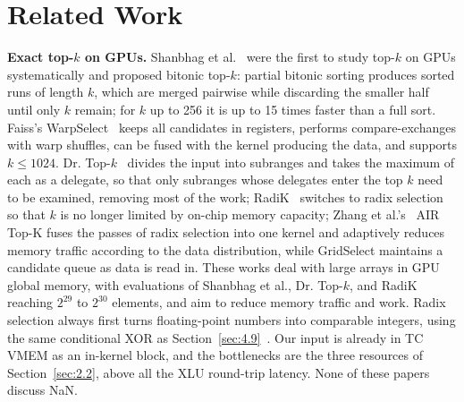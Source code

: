 \documentclass[sigconf,nonacm,balance=false]{acmart}
\begin{document}
\section{Related Work}
\label{sec:10}

\textbf{Exact top-$k$ on GPUs.} Shanbhag et al.~\cite{shanbhag2018} were the first to study top-$k$ on GPUs systematically and proposed bitonic top-$k$: partial bitonic sorting produces sorted runs of length $k$, which are merged pairwise while discarding the smaller half until only $k$ remain; for $k$ up to 256 it is up to 15 times faster than a full sort. Faiss's WarpSelect~\cite{johnson2021faiss} keeps all candidates in registers, performs compare-exchanges with warp shuffles, can be fused with the kernel producing the data, and supports $k \le 1024$. Dr. Top-$k$~\cite{gaihre2021drtopk} divides the input into subranges and takes the maximum of each as a delegate, so that only subranges whose delegates enter the top $k$ need to be examined, removing most of the work; RadiK~\cite{li2024radik} switches to radix selection so that $k$ is no longer limited by on-chip memory capacity; Zhang et al.'s~\cite{zhang2023air} AIR Top-K fuses the passes of radix selection into one kernel and adaptively reduces memory traffic according to the data distribution, while GridSelect maintains a candidate queue as data is read in. These works deal with large arrays in GPU global memory, with evaluations of Shanbhag et al., Dr. Top-$k$, and RadiK reaching $2^{29}$ to $2^{30}$ elements, and aim to reduce memory traffic and work. Radix selection always first turns floating-point numbers into comparable integers, using the same conditional XOR as Section~\ref{sec:4.9}~\cite{herf2001radix}. Our input is already in TC VMEM as an in-kernel block, and the bottlenecks are the three resources of Section~\ref{sec:2.2}, above all the XLU round-trip latency. None of these papers discuss NaN.
\end{document}
